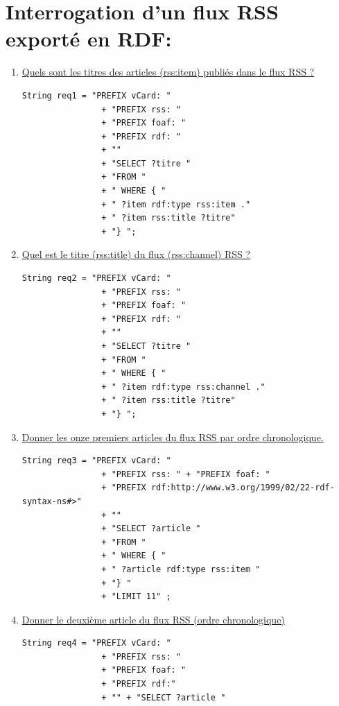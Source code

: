 \documentclass[12pt,a4paper]{article}
\begin{document}
    \section{Interrogation d'un flux RSS exporté en RDF:}
    \begin{justify}
        \begin{enumerate}
            \item \underline{Quels sont les titres des articles (rss:item) publiés dans le flux RSS ?}
            \begin{verbatim}
String req1 = "PREFIX vCard: "
                + "PREFIX rss: "
                + "PREFIX foaf: "
                + "PREFIX rdf: "
                + ""
                + "SELECT ?titre "
                + "FROM "
                + " WHERE { "
                + " ?item rdf:type rss:item ."
                + " ?item rss:title ?titre"
                + "} ";
            \end{verbatim}
            \item \underline{Quel est le titre (rss:title) du flux (rss:channel) RSS ?}
            \begin{verbatim}
String req2 = "PREFIX vCard: "
                + "PREFIX rss: "
                + "PREFIX foaf: "
                + "PREFIX rdf: "
                + ""
                + "SELECT ?titre "
                + "FROM "
                + " WHERE { "
                + " ?item rdf:type rss:channel ."
                + " ?item rss:title ?titre"
                + "} ";
            \end{verbatim}
            \item \underline{Donner les onze premiers articles du flux RSS par ordre chronologique.}
            \begin{verbatim}
String req3 = "PREFIX vCard: "
                + "PREFIX rss: " + "PREFIX foaf: "
                + "PREFIX rdf:http://www.w3.org/1999/02/22-rdf-syntax-ns#>"
                + ""
                + "SELECT ?article "
                + "FROM "
                + " WHERE { "
                + " ?article rdf:type rss:item "
                + "} "
                + "LIMIT 11" ;
            \end{verbatim}
            \item \underline{Donner le deuxième article du flux RSS (ordre chronologique)}
            \begin{verbatim}
String req4 = "PREFIX vCard: "
                + "PREFIX rss: "
                + "PREFIX foaf: "
                + "PREFIX rdf:"
                + "" + "SELECT ?article "

\end{verbatim}
\end{enumerate}
\end{justify}
\end{document}
